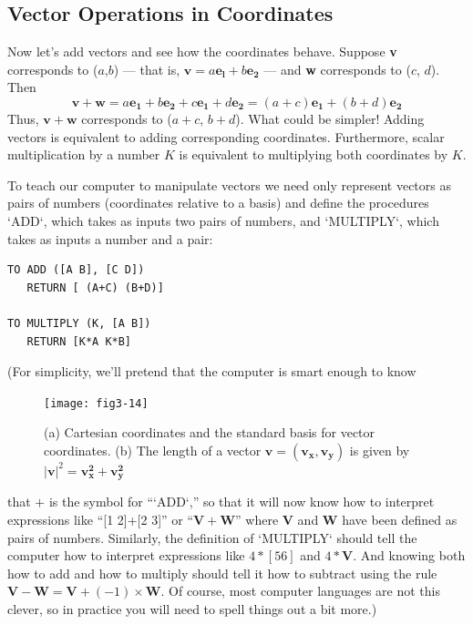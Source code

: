 \documentclass{book}
\begin{document}
\subsection{Vector Operations in Coordinates}

Now let's add vectors and see how the coordinates behave. Suppose \textbf{v}
corresponds to ($a$,$b$) --- that is, $\mathbf{v} = a\mathbf{e_l} + b\mathbf{e_2}$ --- and \textbf{w} corresponds to
($c$, $d$). Then $$\mathbf{v} + \mathbf{w} = a\mathbf{e_1} + b\mathbf{e_2} + c\mathbf{e_1} + d\mathbf{e_2} = (a+c)\mathbf{e_1}+(b+d)\mathbf{e_2}$$ Thus, $\mathbf{v}+\mathbf{w}$ corresponds to ($a+c$, $b+d$). What could be simpler! Adding
vectors is equivalent to adding corresponding coordinates. Furthermore,
scalar multiplication by a number $K$ is equivalent to multiplying both
coordinates by $K$.

To teach our computer to manipulate vectors we need only represent
vectors as pairs of numbers (coordinates relative to a basis) and define
the procedures \textsc{`ADD`}, which takes as inputs two pairs of numbers, and
\textsc{`MULTIPLY`}, which takes as inputs a number and a pair:

\begin{verbatim}
TO ADD ([A B], [C D])
   RETURN [ (A+C) (B+D)]

TO MULTIPLY (K, [A B])
   RETURN [K*A K*B]
\end{verbatim}
(For simplicity, we'll pretend that the computer is smart enough to know

\begin{figure}
\begin{center}
\texttt{[image: fig3-14]}
\caption{(a) Cartesian coordinates and the standard basis for vector coordinates. (b) The length of a vector $\mathbf{v} = (\mathbf{v_x}, \mathbf{v_y})$ is given by $|\mathbf{v}|^2 = \mathbf{v_x^2} + \mathbf{v_y^2}$}
\end{center}
\end{figure}

that $+$ is the symbol for ``\textsc{`ADD`},'' so that it will now know how to interpret
expressions like ``[1 2]+[2 3]'' or ``$\mathbf{V} + \mathbf{W}$'' where $\mathbf{V}$ and $\mathbf{W}$ have been
defined as pairs of numbers. Similarly, the definition of \textsc{`MULTIPLY`} should
tell the computer how to interpret expressions like $4 * [5 6]$ and $4 * \mathbf{V}$.
And knowing both how to add and how to multiply should tell it how to
subtract using the rule $\mathbf{V} - \mathbf{W} = \mathbf{V} + (-1) \times \mathbf{W}$. Of course, most computer
languages are not this clever, so in practice you will need to spell things
out a bit more.)
\end{document}
